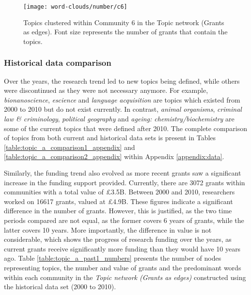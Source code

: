 {\begin{figure}[!htbp]
    \centering
    \texttt{[image: word-clouds/number/c6]}
    \caption[Topics clustered within Community 6 in the Topic network (Grants as edges)]{Topics clustered within Community 6 in the Topic network (Grants as edges). Font size represents the number of grants that contain the topics.}
    \label{fig:topic_a_number_c6}
\end{figure}

\subsubsection{Historical data comparison}

Over the years, the research trend led to new topics being defined, while others were discontinued as they were not necessary anymore. For example, \textit{bionanoscience}, \textit{escience} and \textit{language acquisition} are topics which existed from 2000 to 2010 but do not exist currently. In contrast, \textit{animal organisms}, \textit{criminal law \& criminology},  \textit{political geography} and \textit{ageing: chemistry/biochemistry} are some of the current topics that were defined after 2010. The complete comparison of topics from both current and historical data sets is present in Tables \ref{table:topic_a_comparison1_appendix} and \ref{table:topic_a_comparison2_appendix} within Appendix \ref{appendix:data}.

Similarly, the funding trend also evolved as more recent grants saw a significant increase in the funding support provided. Currently, there are 3072 grants within communities with a total value of \pounds3.5B. Between 2000 and 2010, researchers worked on 16617 grants, valued at \pounds4.9B. These figures indicate a significant difference in the number of grants. However, this is justified, as the two time periods compared are not equal, as the former covers 6 years of grants, while the latter covers 10 years. More importantly, the difference in value is not considerable, which shows the progress of research funding over the years, as current grants receive significantly more funding than they would have 10 years ago. Table \ref{table:topic_a_past1_numbers} presents the number of nodes representing topics, the number and value of grants and the predominant words within each community in the \textit{Topic network (Grants as edges)} constructed using the historical data set (2000 to 2010).

}
